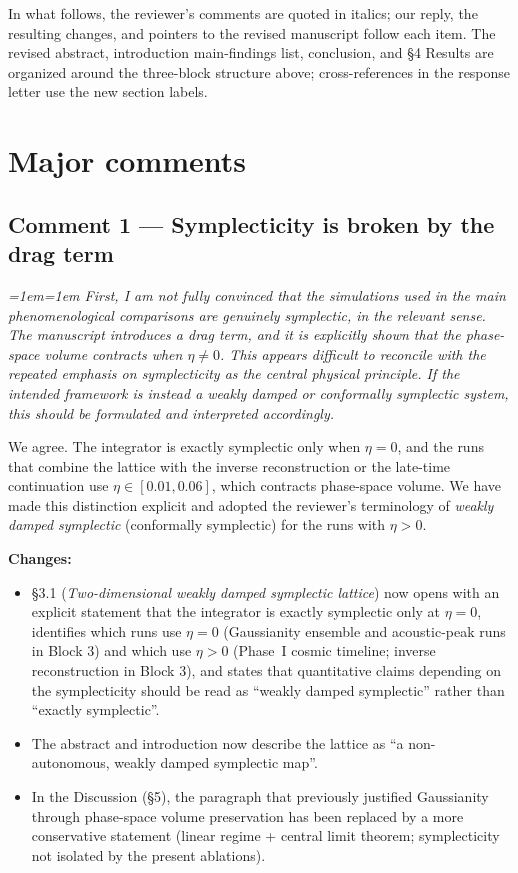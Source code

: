 \documentclass[12pt,a4paper]{article}
\newenvironment{review}{\par\color{revcolor}\itshape\leftskip=1em\rightskip=1em\noindent}{\par}
\begin{document}
In what follows, the reviewer's comments are quoted in italics; our reply, the resulting changes, and pointers to the revised manuscript follow each item.
The revised abstract, introduction main-findings list, conclusion, and §4 Results are organized around the three-block structure above; cross-references in the response letter use the new section labels.

\section*{Major comments}

\subsection*{Comment 1 --- Symplecticity is broken by the drag term}

\begin{review}
\textit{First, I am not fully convinced that the simulations used in the main phenomenological comparisons are genuinely symplectic, in the relevant sense. The manuscript introduces a drag term, and it is explicitly shown that the phase-space volume contracts when $\eta \neq 0$. This appears difficult to reconcile with the repeated emphasis on symplecticity as the central physical principle. If the intended framework is instead a weakly damped or conformally symplectic system, this should be formulated and interpreted accordingly.}
\end{review}

We agree.
The integrator is exactly symplectic only when $\eta = 0$, and the runs that combine the lattice with the inverse reconstruction or the late-time continuation use $\eta \in [0.01, 0.06]$, which contracts phase-space volume.
We have made this distinction explicit and adopted the reviewer's terminology of \emph{weakly damped symplectic} (conformally symplectic) for the runs with $\eta > 0$.

\textbf{Changes:}
\begin{itemize}[leftmargin=2em]
  \item §3.1 (\textit{Two-dimensional weakly damped symplectic lattice}) now opens with an explicit statement that the integrator is exactly symplectic only at $\eta = 0$, identifies which runs use $\eta = 0$ (Gaussianity ensemble and acoustic-peak runs in Block 3) and which use $\eta > 0$ (Phase~I cosmic timeline; inverse reconstruction in Block 3), and states that quantitative claims depending on the symplecticity should be read as ``weakly damped symplectic'' rather than ``exactly symplectic''.
  \item The abstract and introduction now describe the lattice as ``a non-autonomous, weakly damped symplectic map''.
  \item In the Discussion (§5), the paragraph that previously justified Gaussianity through phase-space volume preservation has been replaced by a more conservative statement (linear regime + central limit theorem; symplecticity not isolated by the present ablations).
\end{itemize}
\end{document}
